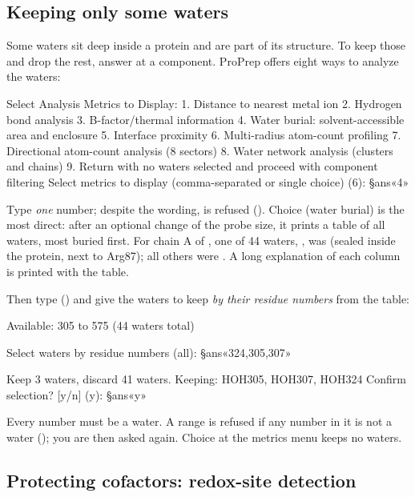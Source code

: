 \subsection{Keeping only some waters}
\label{sec:cleaning-waters}

Some waters sit deep inside a protein and are part of its structure. To keep
those and drop the rest, answer  at a  component. ProPrep
offers eight ways to analyze the waters:
\begin{screen}
Select Analysis Metrics to Display:
   1. Distance to nearest metal ion
   2. Hydrogen bond analysis
   3. B-factor/thermal information
   4. Water burial: solvent-accessible area and enclosure
   5. Interface proximity
   6. Multi-radius atom-count profiling
   7. Directional atom-count analysis (8 sectors)
   8. Water network analysis (clusters and chains)
   9. Return with no waters selected and proceed with component filtering
Select metrics to display (comma-separated or single choice) (6): §ans«4»
\end{screen}
Type \emph{one} number; despite the wording,  is refused
(). Choice
 (water burial) is the most direct: after an optional change of the
probe size, it prints a table of all waters, most buried first. For chain A of
, one of 44 waters, , was  (sealed inside
the protein, next to Arg87); all others were . A long
explanation of each column is printed with the table.

Then type  () and give the waters
to keep \emph{by their residue numbers} from the table:
\begin{screen}
Available: 305 to 575 (44 waters total)

Select waters by residue numbers (all): §ans«324,305,307»

Keep 3 waters, discard 41 waters.
Keeping: HOH305, HOH307, HOH324
Confirm selection? [y/n] (y): §ans«y»
\end{screen}
Every number must be a water. A range is refused if any number in it is not a
water (); you are then asked
again. Choice  at the metrics menu keeps no waters.

\subsection{Protecting cofactors: redox-site detection}
\label{sec:cleaning-protect}

